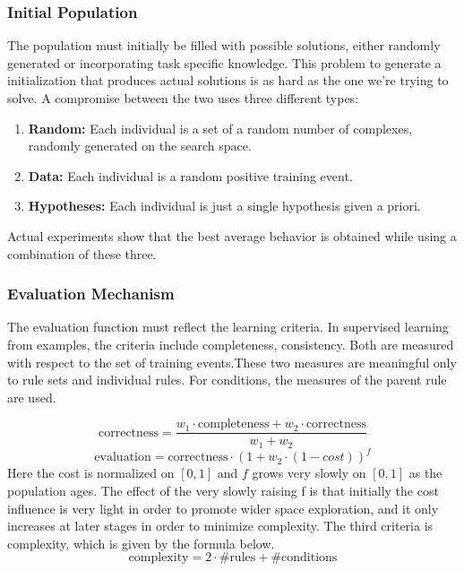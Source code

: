 \documentclass[../main.tex]{subfiles}
\begin{document}
\subsubsection{Initial Population}
The population must initially be filled with possible solutions, either randomly generated or incorporating task specific knowledge. This problem to generate a initialization that produces actual solutions is as hard as the one we're trying to solve. A compromise between the two uses three different types:

\begin{enumerate}
	\item \textbf{Random:} Each individual is a set of a random number of complexes, randomly generated on the search
	space.
	\item \textbf{Data:} Each individual is a random positive training event.
	\item \textbf{Hypotheses:} Each individual is just a single hypothesis given a priori.
\end{enumerate}

Actual experiments show that the best average behavior is obtained while using a combination of these three.

\subsubsection{Evaluation Mechanism}
The evaluation function must reflect the learning criteria. In supervised learning from examples, the criteria include
completeness, consistency. Both are measured with respect to the set of training events.These two measures are
meaningful only to rule sets and individual rules. For conditions, the measures of the parent rule are used.

\begin{equation}
\text{correctness} = \frac{w_1 \cdot \text{completeness} + w_2 \cdot \text{correctness}}{w_1 + w_2}
\end{equation}
\begin{equation}
	\text{evaluation} = \text{correctness} \cdot (1 + w_2 \cdot (1-cost))^f
\end{equation}
Here the cost is normalized on $[0,1]$ and $f$ grows very slowly on $[0,1]$ as the population ages. The effect of the
very slowly raising f is that initially the cost influence is very light in order to promote wider space exploration,
and it only increases at later stages in order to minimize complexity. The third criteria is complexity, which is given
by the formula below.
\begin{equation}
	\text{complexity} = 2 \cdot \text{\#rules} + \text{\#conditions}
\end{equation}
\end{document}
